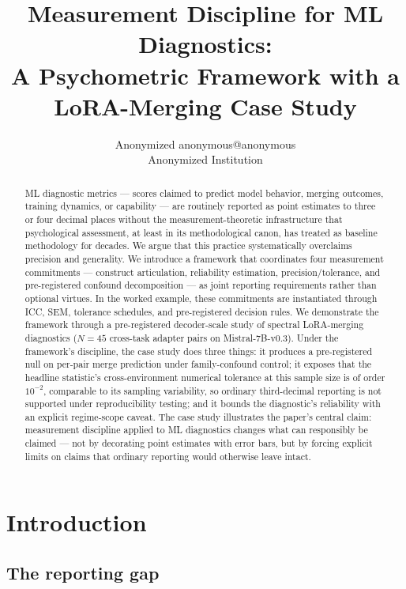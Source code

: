 \documentclass[10pt]{article}
\title{Measurement Discipline for ML Diagnostics:\\
  A Psychometric Framework with a LoRA-Merging Case Study}
\author{\name Anonymized \email anonymous@anonymous \\
      \addr Anonymized Institution}
\begin{document}
\maketitle

\begin{abstract}
ML diagnostic metrics --- scores claimed to predict model behavior,
merging outcomes, training dynamics, or capability --- are routinely
reported as point estimates to three or four decimal places without
the measurement-theoretic infrastructure that psychological
assessment, at least in its methodological canon, has treated as
baseline methodology for decades. We argue that this
practice systematically overclaims precision and generality. We
introduce a framework that coordinates four measurement commitments ---
construct articulation, reliability estimation, precision/tolerance,
and pre-registered confound decomposition --- as joint reporting
requirements rather than optional virtues.
In the worked example, these commitments are instantiated through
ICC, SEM, tolerance schedules, and pre-registered decision rules.
We demonstrate the framework through a pre-registered decoder-scale
study of spectral LoRA-merging diagnostics ($N = 45$ cross-task
adapter pairs on Mistral-7B-v0.3). Under the framework's discipline,
the case study does three things: it produces a pre-registered null
on per-pair merge prediction under family-confound control; it
exposes that the headline statistic's cross-environment numerical
tolerance at this sample size is of order $10^{-2}$, comparable to
its sampling variability, so ordinary third-decimal reporting is
not supported under reproducibility testing; and it
bounds the diagnostic's reliability with an explicit regime-scope
caveat. The case study illustrates the paper's central claim:
measurement discipline applied to ML diagnostics changes what can
responsibly be claimed --- not by decorating point estimates with
error bars, but by forcing explicit limits on claims that
ordinary reporting would otherwise leave intact.
\end{abstract}

\section{Introduction}
\label{sec:introduction}

\subsection{The reporting gap}
\end{document}
